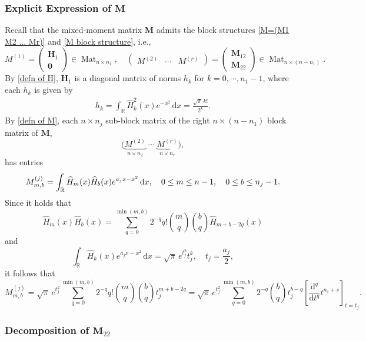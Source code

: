 \documentclass[a4paper,10pt,leqno]{amsart}
\numberwithin{equation}{section}
\theoremstyle{remark}
\newcommand{\dd}{\mathrm{d}}
\newcommand{\R}{\mathbb{R}}
\begin{document}
\subsubsection{Explicit Expression of $\boldsymbol{M}$}

Recall that the mixed-moment matrix $\bm M$ admits the block structures \eqref{M=(M1 M2 ... Mr)} and  \eqref{M block structure}, i.e.,
\[
M^{(1)} = \begin{pmatrix}
    \bm H_1\\
    \bm 0
\end{pmatrix} \in \operatorname{Mat}_{n\times n_1}, \quad \begin{pmatrix}
    M^{(2)} & \cdots & M^{(r)}
\end{pmatrix} = \begin{pmatrix}
    \bm M_{12}\\
    \bm M_{22}
\end{pmatrix} \in \operatorname{Mat}_{n\times (n - n_1)}.
\]
By \eqref{defn of H}, $\bm{H}_1$ is a diagonal matrix of norms $h_k$ for $k=0, \cdots, n_1-1$, where each $h_k$ is given by
\begin{align} \label{app hk}
h_k = \int_\R \widehat{H}_k^2(x) e^{-x^2} \, \dd x = \frac{\sqrt{\pi} \, k!}{2^k}.
\end{align}
By \eqref{defn of M}, each $n \times n_j$ sub-block matrix of the right $n \times (n-n_1)$ block matrix of $\bm M$,
\[
\big(\underbrace{M^{(2)}}_{n \times n_2} \; \cdots \; \underbrace{M^{(r)}}_{n \times n_r} \big),
\]
has entries
\begin{align} \label{defn of M^{(j)}_{m,b}}
M^{(j)}_{m,b} = \int_{\mathbb R}\widehat H_m(x)\widehat H_b(x)e^{a_jx-x^2}\,\dd x, \quad 0 \leq m \leq n-1, \quad 0 \leq b \leq n_j-1.
\end{align}
Since it holds that
\[
\widehat H_m(x)\widehat H_b(x)=\sum_{q=0}^{\min(m,b)}2^{-q}q!\binom{m}{q}\binom{b}{q}\widehat H_{m+b-2q}(x)
\]
and
\[
\int_{\mathbb R}\widehat H_k(x)e^{a_jx-x^2}\,\dd x=\sqrt{\pi}\,e^{t_j^2}t_j^k, \quad t_j = \frac{a_j}{2},
\]
it follows that
\begin{equation}\label{eq:G-derivative-proof}
M^{(j)}_{m,b} = \sqrt{\pi}\,e^{t_j^2}\sum_{q=0}^{\min(m,b)}2^{-q}q!\binom{m}{q}\binom{b}{q}t_j^{m+b-2q} = \sqrt{\pi}\,e^{t_j^2} \sum_{q=0}^{\min(m,b)}2^{-q} \binom{b}{q} t_j^{b-q} \left[\frac{\dd^q}{\dd t^q}t^{n_1+s}\right]_{t=t_j}.
\end{equation}

\subsubsection{Decomposition of $\boldsymbol{M}_{22}$}
\end{document}
